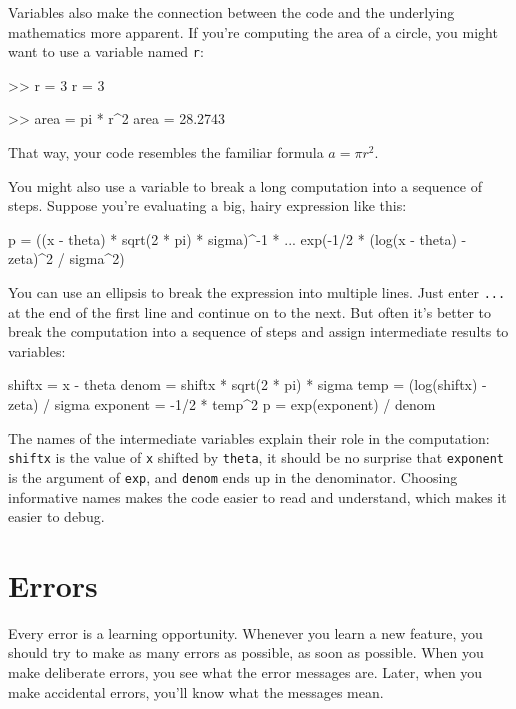 Variables also make the connection between the code and the underlying
mathematics more apparent.  If you're computing the area of a circle,
you might want to use a variable named \lstinline{r}:

\begin{code}
>> r = 3
r = 3

>> area = pi * r^2
area = 28.2743
\end{code}

That way, your code resembles the familiar formula $a = \pi r^2$.

You might also use a variable to break a long computation into a sequence of steps.
Suppose you're evaluating a big, hairy expression like this:

\begin{code}
p = ((x - theta) * sqrt(2 * pi) * sigma)^-1 * ...
exp(-1/2 * (log(x - theta) - zeta)^2 / sigma^2)
\end{code}

You can use an ellipsis to break the expression into multiple lines.
Just enter \lstinline{...} at the end of the first line and continue on to the
next.
But often it's better to break the computation into a sequence of
steps and assign intermediate results to variables:

\begin{code}
shiftx = x - theta
denom = shiftx * sqrt(2 * pi) * sigma
temp = (log(shiftx) - zeta) / sigma
exponent = -1/2 * temp^2
p = exp(exponent) / denom
\end{code}

The names of the intermediate variables explain their role in the
computation:  \lstinline{shiftx} is the value of \lstinline{x} shifted by
\lstinline{theta},  it should be no surprise that \lstinline{exponent} is the argument of \lstinline{exp}, and \lstinline{denom} ends up in the denominator.  Choosing informative names makes the code easier to read and understand, which makes it easier to debug.



\section{Errors}


Every error is a learning opportunity.
Whenever you learn a new feature, you should try to make as many errors as possible, as soon as possible.
When you make deliberate errors, you see what the error messages are.
Later, when you make accidental errors, you'll know what the messages mean.

